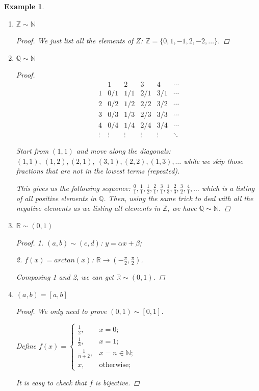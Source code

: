 \documentclass[12pt]{article}
\theoremstyle{blueplain}
\theoremstyle{bluedef}
\theoremstyle{blueremark}
\newtheorem{example}{Example}[section]
\newcommand{\R}{\mathbb{R}}
\newcommand{\N}{\mathbb{N}}
\newcommand{\Z}{\mathbb{Z}}
\newcommand{\Q}{\mathbb{Q}}
\numberwithin{equation}{section}
\begin{document}
\begin{example}
  \begin{enumerate}
    \item $\Z \sim \N$
          \begin{proof}
            We just list all the elements of $Z$: $\Z = \{0, 1, -1, 2, -2, \ldots\}$.
          \end{proof}
    \item $\Q \sim \N$
          \begin{proof}
            \[\begin{array}{c|ccccc}
                       & 1      & 2      & 3      & 4      & \cdots \\ \hline
                1      & 0/1    & 1/1    & 2/1    & 3/1    & \cdots \\
                2      & 0/2    & 1/2    & 2/2    & 3/2    & \cdots \\
                3      & 0/3    & 1/3    & 2/3    & 3/3    & \cdots \\
                4      & 0/4    & 1/4    & 2/4    & 3/4    & \cdots \\
                \vdots & \vdots & \vdots & \vdots & \vdots & \ddots
              \end{array}\]

            Start from $(1,1)$ and move along the diagonals:
            \((1,1),\ (1,2),(2,1),\ (3,1),(2,2),(1,3),\ldots\) while we skip those fractions that are not in the lowest terms (repeated).

            This gives us the following sequence:
            \( \frac{0}{1}, \frac{1}{1}, \frac{1}{2}, \frac{2}{1}, \frac{3}{1}, \frac{1}{3}, \frac{2}{3}, \frac{3}{2}, \frac{4}{1}, \ldots\) which is a listing of all positive elements in $\Q$. Then, using the same trick to deal with all the negative elements as we listing all elements in $\Z$, we have $\Q \sim \N$.
          \end{proof}
    \item $\R \sim (0,1)$
          \begin{proof}
            1. $(a,b) \sim (c,d)$: $y = \alpha x + \beta$;

            2. $f(x) = arctan(x)$: $\R \rightarrow (-\frac{\pi}{2}, \frac{\pi}{2})$.

            Composing 1 and 2, we can get $\R \sim (0,1)$.
          \end{proof}
    \item $(a,b) = [a,b]$
          \begin{proof}
            We only need to prove $(0,1) \sim [0,1]$.

            Define $f(x) = \begin{cases} \frac{1}{2}, & x = 0; \\ \frac{1}{3}, & x = 1; \\ \frac{1}{n+2}, & x = n \in \N; \\ x, & \text{otherwise}; \end{cases}$

            It is easy to check that $f$ is bijective.
          \end{proof}
  \end{enumerate}
\end{example}
\end{document}
